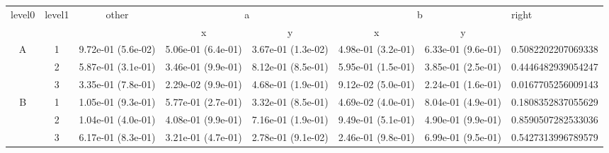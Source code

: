 \begin{tabular}{cccccccl}
\toprule
\multirow{2}{*}{level0} & \multirow{2}{*}{level1}& \multirow{2}{*}{other}&\multicolumn{2}{c}{a}&\multicolumn{2}{c}{b}& \multirow{2}{*}{right}\tabularnewline
\cmidrule(lr){4-5}
\cmidrule(lr){6-7}
&&&x&y&x&y\tabularnewline
\midrule
\multirow{3}{*}{A}&1& 9.72e-01 (5.6e-02)& 5.06e-01 (6.4e-01)& 3.67e-01 (1.3e-02)& 4.98e-01 (3.2e-01)& 6.33e-01 (9.6e-01)& 0.5082202207069338\tabularnewline
&2& 5.87e-01 (3.1e-01)& 3.46e-01 (9.9e-01)& 8.12e-01 (8.5e-01)& 5.95e-01 (1.5e-01)& 3.85e-01 (2.5e-01)& 0.4446482939054247\tabularnewline
&3& 3.35e-01 (7.8e-01)& 2.29e-02 (9.9e-01)& 4.68e-01 (1.9e-01)& 9.12e-02 (5.0e-01)& 2.24e-01 (1.6e-01)& 0.0167705256009143\tabularnewline
\midrule
\multirow{3}{*}{B}&1& 1.05e-01 (9.3e-01)& 5.77e-01 (2.7e-01)& 3.32e-01 (8.5e-01)& 4.69e-02 (4.0e-01)& 8.04e-01 (4.9e-01)& 0.1808352837055629\tabularnewline
&2& 1.04e-01 (4.0e-01)& 4.08e-01 (9.9e-01)& 7.16e-01 (1.9e-01)& 9.49e-01 (5.1e-01)& 4.90e-01 (9.9e-01)& 0.8590507282533036\tabularnewline
&3& 6.17e-01 (8.3e-01)& 3.21e-01 (4.7e-01)& 2.78e-01 (9.1e-02)& 2.46e-01 (9.8e-01)& 6.99e-01 (9.5e-01)& 0.5427313996789579\tabularnewline
\bottomrule
\end{tabular}
